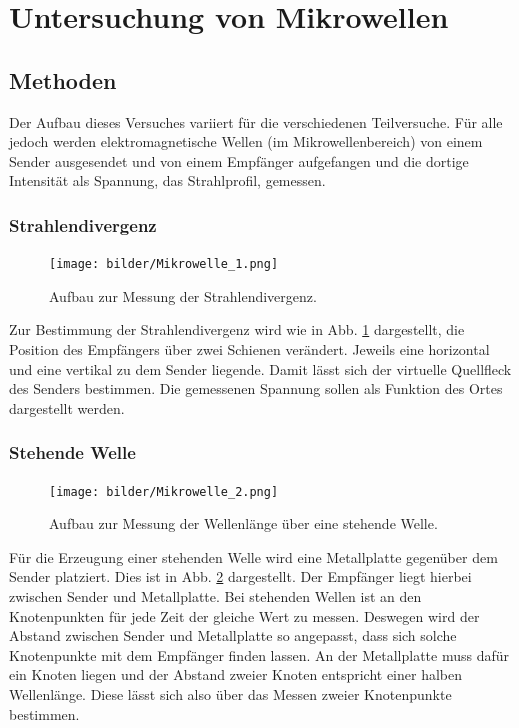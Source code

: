 \section{Untersuchung von Mikrowellen}

	\subsection{Methoden} \label{Methoden}
		
		Der Aufbau dieses Versuches variiert für die verschiedenen Teilversuche.
		Für alle jedoch werden elektromagnetische Wellen (im Mikrowellenbereich) von einem Sender ausgesendet und von einem Empfänger aufgefangen und die dortige Intensität als Spannung, das Strahlprofil, gemessen.
		
		\subsubsection*{Strahlendivergenz}
		\begin{figure}[ht]
			\centering
			\texttt{[image: bilder/Mikrowelle\_1.png]}
			\caption{Aufbau zur Messung der Strahlendivergenz.\cite{WWU}}
			\label{fig:Aufbau1}	
		\end{figure}
		Zur Bestimmung der Strahlendivergenz wird wie in Abb. \ref{fig:Aufbau1} dargestellt, die Position des Empfängers über zwei Schienen verändert. 
		Jeweils eine horizontal und eine vertikal zu dem Sender liegende. 
		Damit lässt sich der virtuelle Quellfleck des Senders bestimmen.
		Die gemessenen Spannung sollen als Funktion des Ortes dargestellt werden. 
		
		\subsubsection*{Stehende Welle}
		\begin{figure}[ht]
			\centering
			\texttt{[image: bilder/Mikrowelle\_2.png]}
			\caption{Aufbau zur Messung der Wellenlänge über eine stehende Welle.\cite{WWU}}
			\label{fig:Aufbau2}	
		\end{figure}
		Für die Erzeugung einer stehenden Welle wird eine Metallplatte gegenüber dem Sender platziert. 
		Dies ist in Abb. \ref{fig:Aufbau2} dargestellt.
		Der Empfänger liegt hierbei zwischen Sender und Metallplatte. 
		Bei stehenden Wellen ist an den Knotenpunkten für jede Zeit der gleiche Wert zu messen.
		Deswegen wird der Abstand zwischen Sender und Metallplatte so angepasst, dass sich solche Knotenpunkte mit dem Empfänger finden lassen.
		An der Metallplatte muss dafür ein Knoten liegen und der Abstand zweier Knoten entspricht einer halben Wellenlänge.
		Diese lässt sich also über das Messen zweier Knotenpunkte bestimmen.
		
